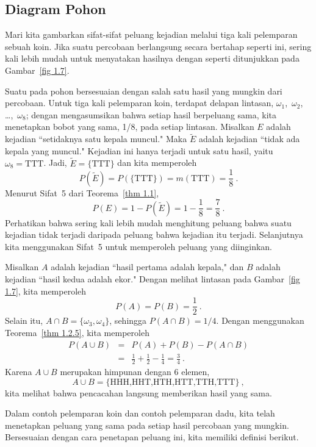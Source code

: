 \subsection*{Diagram Pohon}

\begin{example}\label{exam 1.8}
Mari kita gambarkan sifat-sifat peluang kejadian melalui tiga kali
pelemparan sebuah koin.  Jika suatu percobaan berlangsung secara bertahap
seperti
ini, sering kali lebih mudah untuk menyatakan hasilnya dengan  seperti ditunjukkan pada Gambar~\ref {fig 1.7}.


Suatu  pada pohon bersesuaian dengan salah satu hasil yang mungkin dari
percobaan.  Untuk tiga kali pelemparan koin, terdapat delapan lintasan,
$\omega_1$,~$\omega_2$, \dots,~$\omega_8$; dengan mengasumsikan bahwa setiap hasil
berpeluang sama, kita menetapkan bobot yang sama, 1/8, pada setiap lintasan.  Misalkan $E$ adalah
kejadian
``setidaknya satu kepala muncul."  Maka $\tilde E$ adalah kejadian ``tidak ada kepala yang
muncul."  Kejadian ini hanya terjadi untuk satu hasil, yaitu $\omega_8 = \mbox{TTT}$. 
Jadi, $\tilde E = \{\mbox{TTT}\}$ dan kita memperoleh
$$
P(\tilde E) = P(\{\mbox{TTT}\}) = m(\mbox{TTT}) = \frac18\ .
$$
Menurut Sifat~5 dari Teorema~\ref{thm 1.1},
$$
P(E) = 1 - P(\tilde E) = 1 - \frac18 = \frac78\ .
$$
Perhatikan bahwa sering kali lebih mudah menghitung peluang bahwa suatu
kejadian tidak terjadi daripada peluang bahwa kejadian itu terjadi.  Selanjutnya kita menggunakan
Sifat~5 untuk memperoleh peluang yang diinginkan.

Misalkan $A$ adalah kejadian ``hasil pertama adalah kepala," dan $B$ adalah kejadian ``hasil
kedua adalah ekor."  Dengan melihat lintasan pada Gambar~\ref{fig 1.7},
kita memperoleh
$$
P(A) = P(B) = \frac12\ .
$$
Selain itu, $A \cap B = \{\omega_3,\omega_4\}$, sehingga $P(A \cap B) = 1/4.$ 
Dengan menggunakan Teorema~\ref{thm 1.2.5}, kita memperoleh
\begin{eqnarray*}
P(A \cup B) & = & P(A) + P(B) - P(A \cap B) \\
& = & \frac 12 + \frac 12 - \frac 14 = \frac 34\ .
\end{eqnarray*}
Karena $A \cup B$ merupakan himpunan dengan 6 elemen,
$$
A \cup B = \{\mbox{HHH,HHT,HTH,HTT,TTH,TTT}\}\ ,
$$
kita melihat bahwa pencacahan langsung memberikan hasil yang sama.
\end{example}
\par
Dalam contoh pelemparan koin dan contoh pelemparan dadu, kita telah menetapkan
peluang yang sama pada setiap hasil percobaan yang mungkin. 
Bersesuaian
dengan cara penetapan peluang ini, kita memiliki definisi berikut.

